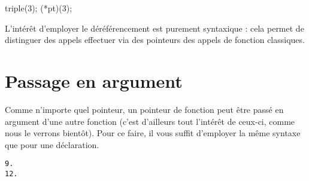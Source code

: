 \documentclass[]{article}
\newenvironment{Shaded}{}{}
\newcommand{\DataTypeTok}[1]{\textcolor[rgb]{0.56,0.13,0.00}{{#1}}}
\newcommand{\DecValTok}[1]{\textcolor[rgb]{0.25,0.63,0.44}{{#1}}}
\newcommand{\SpecialCharTok}[1]{\textcolor[rgb]{0.25,0.44,0.63}{{#1}}}
\newcommand{\StringTok}[1]{\textcolor[rgb]{0.25,0.44,0.63}{{#1}}}
\newcommand{\ImportTok}[1]{{#1}}
\newcommand{\ControlFlowTok}[1]{\textcolor[rgb]{0.00,0.44,0.13}{\textbf{{#1}}}}
\newcommand{\PreprocessorTok}[1]{\textcolor[rgb]{0.74,0.48,0.00}{{#1}}}
\newcommand{\NormalTok}[1]{{#1}}
\begin{document}
\begin{Shaded}
\begin{Highlighting}[]
\NormalTok{triple(}\DecValTok{3}\NormalTok{);}
\NormalTok{(*pt)(}\DecValTok{3}\NormalTok{);}
\end{Highlighting}
\end{Shaded}

L'intérêt d'employer le déréférencement est purement syntaxique : cela
permet de distinguer des appels effectuer via des pointeurs des appels
de fonction classiques.

\section{Passage en argument}\label{passage-en-argument}

Comme n'importe quel pointeur, un pointeur de fonction peut être passé
en argument d'une autre fonction (c'est d'ailleurs tout l'intérêt de
ceux-ci, comme nous le verrons bientôt). Pour ce faire, il vous suffit
d'employer la même syntaxe que pour une déclaration.

\begin{Shaded}
\end{Shaded}

\begin{verbatim}
9.
12.
\end{verbatim}
\end{document}

